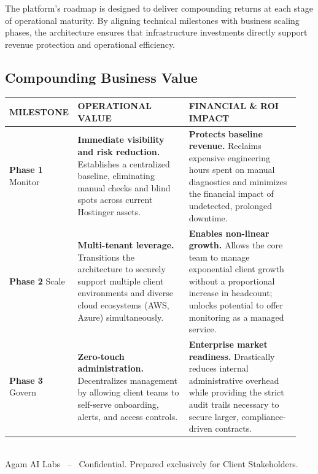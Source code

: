 \documentclass[11pt,a4paper]{article}
\newcommand{\thd}[1]{\textsc{\bfseries\color{white}\fontsize{8.6}{8.6}\selectfont #1}}
\begin{document}
The platform's roadmap is designed to deliver compounding returns at each stage of operational maturity. By aligning technical milestones with business scaling phases, the architecture ensures that infrastructure investments directly support revenue protection and operational efficiency.

\vspace{1em}
\subsection{Compounding Business Value}
\vspace{0.5em}

\renewcommand{\arraystretch}{1.7}
\begin{tabular}{@{}>{\raggedright\arraybackslash}p{0.18\linewidth}>{\raggedright\arraybackslash}p{0.38\linewidth}>{\raggedright\arraybackslash}p{0.38\linewidth}@{}}
\rowcolor{navy}
\thd{MILESTONE} & \thd{OPERATIONAL VALUE} & \thd{FINANCIAL \& ROI IMPACT} \\
\midrule
\textbf{Phase 1} \newline Monitor & 
\textbf{Immediate visibility and risk reduction.} Establishes a centralized baseline, eliminating manual checks and blind spots across current Hostinger assets. & 
\textbf{Protects baseline revenue.} Reclaims expensive engineering hours spent on manual diagnostics and minimizes the financial impact of undetected, prolonged downtime. \\
\rowcolor{tabletint}
\textbf{Phase 2} \newline Scale & 
\textbf{Multi-tenant leverage.} Transitions the architecture to securely support multiple client environments and diverse cloud ecosystems (AWS, Azure) simultaneously. & 
\textbf{Enables non-linear growth.} Allows the core team to manage exponential client growth without a proportional increase in headcount; unlocks potential to offer monitoring as a managed service. \\
\textbf{Phase 3} \newline Govern & 
\textbf{Zero-touch administration.} Decentralizes management by allowing client teams to self-serve onboarding, alerts, and access controls. & 
\textbf{Enterprise market readiness.} Drastically reduces internal administrative overhead while providing the strict audit trails necessary to secure larger, compliance-driven contracts. \\
\bottomrule
\end{tabular}

\vfill
\noindent{\color{linegray}\rule{\linewidth}{0.6pt}}\\[6pt]
\fontsize{8.3}{10}\selectfont\textcolor{softgray}{Agam AI Labs \ -- \ Confidential. Prepared exclusively for Client Stakeholders.}
\end{document}
